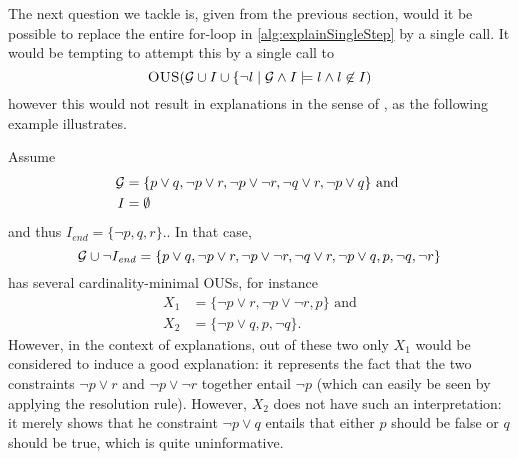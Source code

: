 The next question we tackle is, given \fall from the previous section, would it be possible to replace the entire for-loop in \cref{alg:explainSingleStep} by a single \omus call.
It would be tempting to attempt this by a single call to 
\[\textsc{OUS}(\mathcal{G} \cup I\cup\{\lnot l\mid \mathcal{G}  \land I\models l\land l\not\in I)\]
however this would not result in explanations in the sense of \citet{ecai/BogaertsGCG20}, as the following example illustrates. 
\begin{example}
Assume \begin{align*}
         \mathcal{G}  &= \{p\lor q, \lnot p \lor r, \lnot p \lor \lnot r, \lnot q\lor r, \lnot p \lor q \}\text{ and }\\
         I &= \emptyset
       \end{align*}
       and thus
$         I_{\mathit{end}} = \{ \lnot p, q, r\}.
$. 
In that case, 
\[\mathcal{G} \cup \lnot I_{\mathit{end}} = \{p\lor q, \lnot p \lor r, \lnot p \lor \lnot r, \lnot q\lor r, \lnot p \lor q , p,\lnot q,\lnot r \}\]
has several cardinality-minimal OUSs, for instance 
\begin{align*}
X_1 &=    \{\lnot p \lor r, \lnot p \lor \lnot r, p\}\text{ and}\\
X_2 &= \{\lnot p \lor q ,  p, \lnot q\}.
\end{align*}
However, in the context of explanations, out of these two only $X_1$ would be considered to induce a good explanation: it represents the fact that the two constraints $\lnot p \lor r$ and $ \lnot p \lor \lnot r$ together entail $\lnot p$ (which can easily be seen by applying the resolution rule). However, $X_2$ does not have such an interpretation: it merely shows that he constraint $\lnot p \lor q$ entails that either $p$ should be false or $q$ should be true, which is quite uninformative. 
\end{example}

